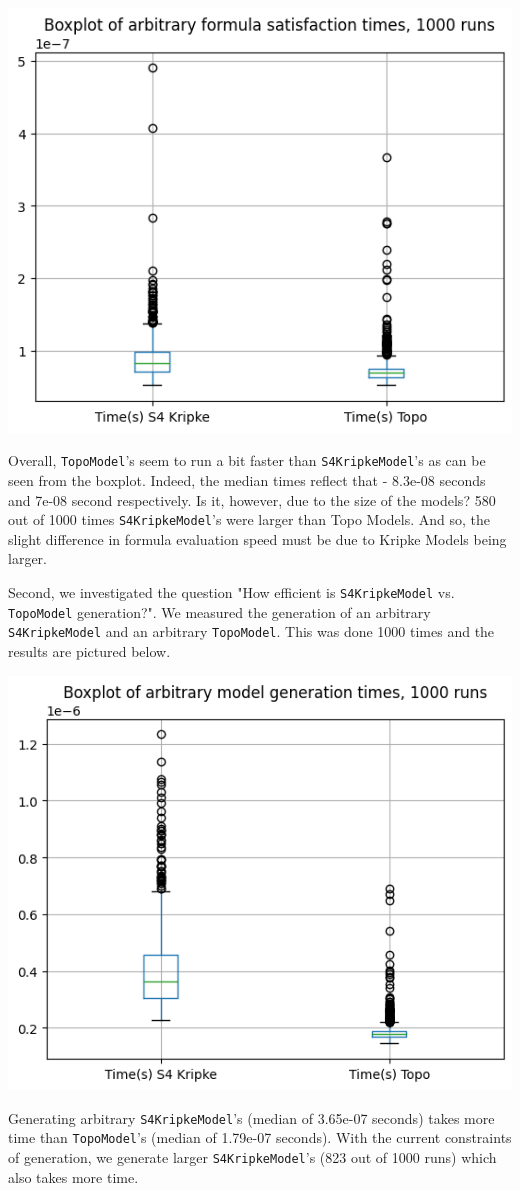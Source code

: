 \documentclass[12pt,a4paper]{article}
\begin{document}
\begin{center}
\includegraphics*[width=0.5\linewidth]{bench-formula-satisfaction.png}
\end{center}

Overall, \verb|TopoModel|'s seem to run a bit faster than \verb|S4KripkeModel|'s as can be seen from the boxplot.
Indeed, the median times reflect that - 8.3e-08 seconds and 7e-08 second respectively.
Is it, however, due to the size of the models? 580 out of 1000 times \verb|S4KripkeModel|'s were larger
than Topo Models. And so, the slight difference in formula evaluation speed must be due to
Kripke Models being larger.

Second, we investigated the question "How efficient is \verb|S4KripkeModel| vs. \verb|TopoModel| generation?".
We measured the generation of an arbitrary \verb|S4KripkeModel| and an arbitrary \verb|TopoModel|.
This was done 1000 times and the results are pictured below.

\begin{center}
\includegraphics*[width=0.5\linewidth]{bench-model-generation.png}
\end{center}

Generating arbitrary \verb|S4KripkeModel|'s (median of 3.65e-07 seconds) takes more time than \verb|TopoModel|'s
(median of 1.79e-07 seconds). With the current constraints of generation, we generate larger
\verb|S4KripkeModel|'s (823 out of 1000 runs) which also takes more time.
\end{document}
